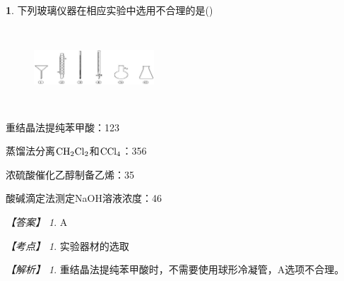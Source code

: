 \documentclass[UTF8, 10pt, a4paper, oneside]{ctexart}
\newcommand{\fs}[1]{{\fangsong #1}}%
\newcommand{\circled}[1]{{\small{\textcircled{\tiny{#1}}}}}%
\theoremstyle{definition}
\newtheorem{subexercise}{}[exercise]%
\theoremstyle{remark}
\newtheorem*{answer}{【答案】}
\newtheorem*{point}{【考点】}      %
\newtheorem*{explanation}{【解析】}     %
\theoremstyle{plain}
\begin{document}
\begin{subexercise}
    \fs{[2023湖南3]}下列玻璃仪器在相应实验中选用不合理的是\quad(\quad)
    \begin{figure}[ht!]
        \centering
        \includegraphics[width=0.4\textwidth, height=3cm]{assists/5.4.1.jpg}
    \end{figure}
    \begin{adjustwidth}{4em}{}
        \begin{asparaenum}[A. ]
            \item 重结晶法提纯苯甲酸：\circled{1}\circled{2}\circled{3}
            \item 蒸馏法分离$\ce{CH2Cl2}$和$\ce{CCl4}$：\circled{3}\circled{5}\circled{6}
            \item 浓硫酸催化乙醇制备乙烯：\circled{3}\circled{5}
            \item 酸碱滴定法测定NaOH溶液浓度：\circled{4}\circled{6}
        \end{asparaenum}
    \end{adjustwidth}
    \begin{answer}
        A
    \end{answer}
    \begin{point}
        实验器材的选取
    \end{point}
    \begin{explanation}
        重结晶法提纯苯甲酸时，不需要使用球形冷凝管，A选项不合理。
    \end{explanation}
\end{subexercise}
\end{document}
